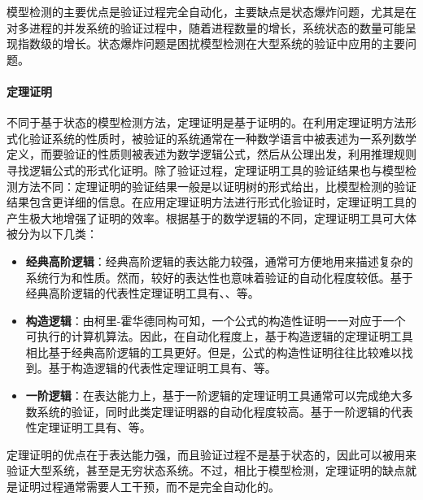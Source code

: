 模型检测的主要优点是验证过程完全自动化，主要缺点是状态爆炸问题，尤其是在对多进程的并发系统的验证过程中，随着进程数量的增长，系统状态的数量可能呈现指数级的增长。状态爆炸问题是困扰模型检测在大型系统的验证中应用的主要问题。

\paragraph{定理证明}
不同于基于状态的模型检测方法，定理证明\cite{Fitting96,Loveland78,Burel09}是基于证明的。在利用定理证明方法形式化验证系统的性质时，被验证的系统通常在一种数学语言中被表述为一系列数学定义，而要验证的性质则被表述为数学逻辑公式，然后从公理出发，利用推理规则寻找逻辑公式的形式化证明。除了验证过程，定理证明工具的验证结果也与模型检测方法不同：定理证明的验证结果一般是以证明树的形式给出，比模型检测的验证结果包含更详细的信息。在应用定理证明方法进行形式化验证时，定理证明工具的产生极大地增强了证明的效率。根据基于的数学逻辑的不同，定理证明工具可大体被分为以下几类：
\begin{itemize}

	\item \textbf{经典高阶逻辑}：经典高阶逻辑的表达能力较强，通常可方便地用来描述复杂的系统行为和性质。然而，较好的表达性也意味着验证的自动化程度较低。基于经典高阶逻辑的代表性定理证明工具有\cite{Gordon00}、\cite{Nipkow12}、\cite{OwreRS92}等。
	\item \textbf{构造逻辑}：由柯里-霍华德同构可知，一个公式的构造性证明一一对应于一个可执行的计算机算法。因此，在自动化程度上，基于构造逻辑的定理证明工具相比基于经典高阶逻辑的工具更好。但是，公式的构造性证明往往比较难以找到。基于构造逻辑的代表性定理证明工具有\cite{BertotC04}、\cite{AllenCEKL00}等。
	\item \textbf{一阶逻辑}：在表达能力上，基于一阶逻辑的定理证明工具通常可以完成绝大多数系统的验证，同时此类定理证明器的自动化程度较高。基于一阶逻辑的代表性定理证明工具有\cite{KaufmannM08}、\cite{cs-LO-9301106}等。
\end{itemize}
定理证明的优点在于表达能力强，而且验证过程不是基于状态的，因此可以被用来验证大型系统，甚至是无穷状态系统。不过，相比于模型检测，定理证明的缺点就是证明过程通常需要人工干预，而不是完全自动化的。

